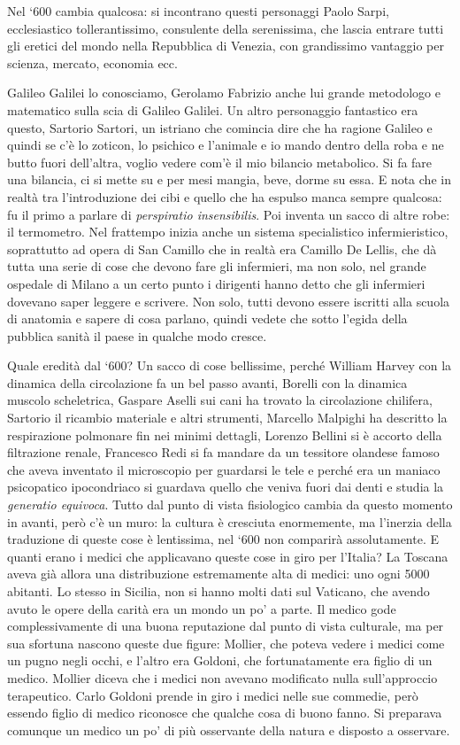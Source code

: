 \documentclass[]{article}
\begin{document}
Nel `600 cambia qualcosa: si incontrano questi personaggi Paolo Sarpi,
ecclesiastico tollerantissimo, consulente della serenissima, che lascia
entrare tutti gli eretici del mondo nella Repubblica di Venezia, con
grandissimo vantaggio per scienza, mercato, economia ecc.

Galileo Galilei lo conosciamo, Gerolamo Fabrizio anche lui grande
metodologo e matematico sulla scia di Galileo Galilei. Un altro
personaggio fantastico era questo, Sartorio Sartori, un istriano che
comincia dire che ha ragione Galileo e quindi se c'è lo zoticon, lo
psichico e l'animale e io mando dentro della roba e ne butto fuori
dell'altra, voglio vedere com'è il mio bilancio metabolico. Si fa fare
una bilancia, ci si mette su e per mesi mangia, beve, dorme su essa. E
nota che in realtà tra l'introduzione dei cibi e quello che ha espulso
manca sempre qualcosa: fu il primo a parlare di \emph{perspiratio
insensibilis}. Poi inventa un sacco di altre robe: il termometro. Nel
frattempo inizia anche un sistema specialistico infermieristico,
soprattutto ad opera di San Camillo che in realtà era Camillo De Lellis,
che dà tutta una serie di cose che devono fare gli infermieri, ma non
solo, nel grande ospedale di Milano a un certo punto i dirigenti hanno
detto che gli infermieri dovevano saper leggere e scrivere. Non solo,
tutti devono essere iscritti alla scuola di anatomia e sapere di cosa
parlano, quindi vedete che sotto l'egida della pubblica sanità il paese
in qualche modo cresce.

Quale eredità dal `600? Un sacco di cose bellissime, perché William
Harvey con la dinamica della circolazione fa un bel passo avanti,
Borelli con la dinamica muscolo scheletrica, Gaspare Aselli sui cani ha
trovato la circolazione chilifera, Sartorio il ricambio materiale e
altri strumenti, Marcello Malpighi ha descritto la respirazione
polmonare fin nei minimi dettagli, Lorenzo Bellini si è accorto della
filtrazione renale, Francesco Redi si fa mandare da un tessitore
olandese famoso che aveva inventato il microscopio per guardarsi le tele
e perché era un maniaco psicopatico ipocondriaco si guardava quello che
veniva fuori dai denti e studia la \emph{generatio equivoca}. Tutto dal
punto di vista fisiologico cambia da questo momento in avanti, però c'è
un muro: la cultura è cresciuta enormemente, ma l'inerzia della
traduzione di queste cose è lentissima, nel `600 non comparirà
assolutamente. E quanti erano i medici che applicavano queste cose in
giro per l'Italia? La Toscana aveva già allora una distribuzione
estremamente alta di medici: uno ogni 5000 abitanti. Lo stesso in
Sicilia, non si hanno molti dati sul Vaticano, che avendo avuto le opere
della carità era un mondo un po' a parte. Il medico gode
complessivamente di una buona reputazione dal punto di vista culturale,
ma per sua sfortuna nascono queste due figure: Mollier, che poteva
vedere i medici come un pugno negli occhi, e l'altro era Goldoni, che
fortunatamente era figlio di un medico. Mollier diceva che i medici non
avevano modificato nulla sull'approccio terapeutico. Carlo Goldoni
prende in giro i medici nelle sue commedie, però essendo figlio di
medico riconosce che qualche cosa di buono fanno. Si preparava comunque
un medico un po' di più osservante della natura e disposto a osservare.
\end{document}
